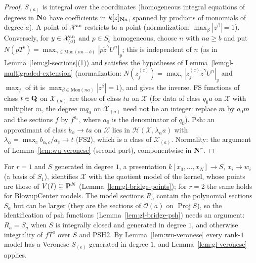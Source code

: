 \begin{proof}
$S_{(a)}$ is integral over the coordinates (homogeneous integral equations of degrees in $\mathbf{N} a$ have coefficients in $k[z]_{\mathbf{N} a}$, spanned by products of
monomials of degree $a$). A point of $\mathcal X^{\mathrm{an}}$ restricts to a point (normalization: $\max_\beta|z^\beta|=1$). Conversely, for $y\in\mathcal X_{(a)}^{\mathrm{an}}$
and $p\in S_b$ homogeneous, choose $n$ with $na\ge b$ and put $N(pT^b)=\max_{\gamma\in\mathrm{Mon}(na-b)}|p\tilde z^\gamma U^n|_y$; this is independent of $n$
(as in Lemma~\ref{lem:gl-sections}(1)) and satisfies the hypotheses of Lemma~\ref{lem:gl-multigraded-extension} (normalization:
$N(z^{(c)}_j)=\max_\gamma|z^{(c)}_j\tilde z^\gamma U^n|_y$ and $\max_j$ of it is $\max_{\beta\in\mathrm{Mon}(na)}|z^\beta|=1$), and gives the inverse. FS
functions of class $t\in\mathbf{Q}$ on $\mathcal X_{(a)}$ are those of class $ta$ on $\mathcal X$ (for data of class $q_0a$ on $\mathcal X$ with
multiplier $m$, the degree $mq_0$ on $\mathcal X_{(a)}$ need not be an integer: replace $m$ by $a_0m$ and the sections $f$ by $f^{a_0}$, where
$a_0$ is the denominator of $q_0$). Psh: an approximant of class $b_\alpha\to ta$ on $\mathcal X$ lies
in $\mathcal H(\mathcal X,\lambda_\alpha a)$ with $\lambda_\alpha=\max_cb_{\alpha,c}/a_c\to t$ (FS2), which is a class of $\mathcal X_{(a)}$. Normality: the argument of
Lemma~\ref{lem:wu-veronese} (second part), componentwise in $\mathbf{N}^r$.
\end{proof}

\begin{remark}\label{rmk:gl-bridges}
For $r=1$ and $S$ generated in degree $1$, a presentation $k[x_0,\dots,x_N]\to S$, $x_i\mapsto w_i$ (a basis of $S_1$), identifies $\mathcal X$ with the
quotient model of the kernel, whose points are those of $V(I)\subseteq\mathbf{P}^N$ (Lemma~\ref{lem:gl-bridge-points}); for $r=2$ the same holds for
$\mathrm{BlowupCenter}$ models. The model sections $R_a$ contain the polynomial sections $S_a$ but can be larger (they are the sections of
$\mathcal O(a)$ on $\operatorname{Proj}S$), so the identification of psh functions (Lemma~\ref{lem:gl-bridge-psh}) needs an argument: $R_a=S_a$
when $S$ is integrally closed and generated in degree $1$, and otherwise integrality of $fT^a$ over $S$ and PSH2. By Lemma~\ref{lem:wu-veronese}
every rank-$1$ model has a Veronese $S_{(e)}$ generated in degree $1$, and Lemma~\ref{lem:gl-veronese} applies.
\end{remark}


